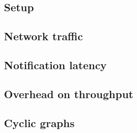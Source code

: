 \label {fs-acker-experiments}

\subsection{Setup}

\subsection{Network traffic}

\subsection{Notification latency}

\subsection{Overhead on throughput}

\subsection{Cyclic graphs}



